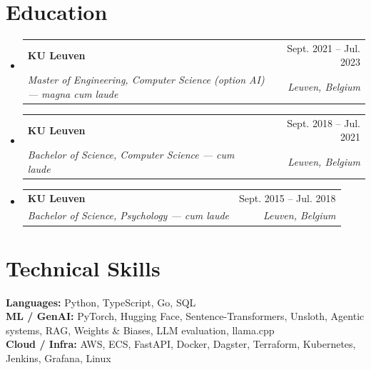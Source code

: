 \documentclass[letterpaper,11pt]{article}
\makeatletter
\newcommand{\resumeSubheading}[4]{
  \vspace{-2pt}\item
    \begin{tabular*}{0.97\textwidth}[t]{l@{\extracolsep{\fill}}r}
      \textbf{#1} & #2 \\
      \textit{\small#3} & \textit{\small #4} \\
    \end{tabular*}\vspace{-7pt}
}
\newcommand{\resumeSubHeadingListStart}{\begin{itemize}[leftmargin=0.15in, label={}]}
\newcommand{\resumeSubHeadingListEnd}{\end{itemize}}
\makeatother
\begin{document}
  \section{Education}
    \resumeSubHeadingListStart
      \resumeSubheading
        {KU Leuven}{Sept. 2021 -- Jul. 2023}
        {Master of Engineering, Computer Science (option AI) --- magna cum laude}{Leuven, Belgium}
      \resumeSubheading
        {KU Leuven}{Sept. 2018 -- Jul. 2021}
        {Bachelor of Science, Computer Science --- cum laude}{Leuven, Belgium}
      \resumeSubheading
        {KU Leuven}{Sept. 2015 -- Jul. 2018}
        {Bachelor of Science, Psychology --- cum laude}{Leuven, Belgium}
    \resumeSubHeadingListEnd
    
 \section{Technical Skills}
   \begin{itemize}[leftmargin=0.15in, label={}]
      \small{\item{
  \textbf{Languages:} Python, TypeScript, Go, SQL \\
    \textbf{ML / GenAI:} PyTorch, Hugging Face, Sentence-Transformers, Unsloth, Agentic systems, RAG, Weights \& Biases, LLM evaluation, llama.cpp \\
  \textbf{Cloud / Infra:} AWS, ECS, FastAPI, Docker, Dagster, Terraform, Kubernetes, Jenkins, Grafana, Linux
      }}
\end{itemize}



\end{document}
